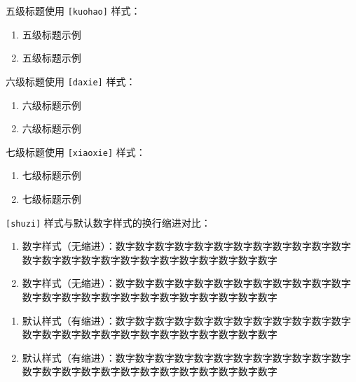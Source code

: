五级标题使用 \verb|[kuohao]| 样式：
\begin{enumerate}[kuohao]
    \item 五级标题示例
    \item 五级标题示例
\end{enumerate}

六级标题使用 \verb|[daxie]| 样式：
\begin{enumerate}[daxie]
    \item 六级标题示例
    \item 六级标题示例
\end{enumerate}

七级标题使用 \verb|[xiaoxie]| 样式：
\begin{enumerate}[xiaoxie]
    \item 七级标题示例
    \item 七级标题示例
\end{enumerate}

\verb|[shuzi]| 样式与默认数字样式的换行缩进对比：
\begin{enumerate}[shuzi]
    \item 数字样式（无缩进）：数字数字数字数字数字数字数字数字数字数字数字数字数字数字数字数字数字数字数字数字数字数字数字数字数字
    \item 数字样式（无缩进）：数字数字数字数字数字数字数字数字数字数字数字数字数字数字数字数字数字数字数字数字数字数字数字数字数字
\end{enumerate}
\begin{enumerate}
    \item 默认样式（有缩进）：数字数字数字数字数字数字数字数字数字数字数字数字数字数字数字数字数字数字数字数字数字数字数字数字数字
    \item 默认样式（有缩进）：数字数字数字数字数字数字数字数字数字数字数字数字数字数字数字数字数字数字数字数字数字数字数字数字数字
\end{enumerate}